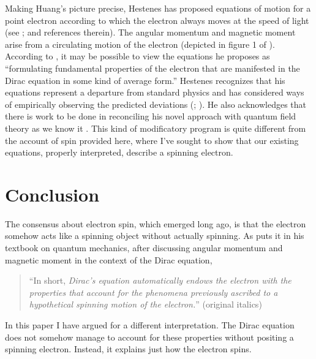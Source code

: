 \documentclass[12pt,secnumarabic,amsmath,amssymb,balancelastpage,nofootinbib]{article}
\begin{document}
Making Huang's picture precise, Hestenes has proposed equations of motion for a point electron according to which the electron always moves at the speed of light (see \citealp{gull1993}; \citealp{hestenes2008, hestenes2010} and references therein).  The angular momentum and magnetic moment arise from a circulating motion of the electron (depicted in figure 1 of \citealp{hestenes2008}).  According to \citet[pg.\ 2]{hestenes2010}, it may be possible to view the equations he proposes as ``formulating fundamental properties of the electron that are manifested in the Dirac equation in some kind of average form.''  Hestenes recognizes that his equations represent a departure from standard physics and has considered ways of empirically observing the predicted deviations (\citealp{hestenes2008}; \citealp[sections 9.1 and 11]{hestenes2010}).  He also acknowledges that there is work to be done in reconciling his novel approach with quantum field theory as we know it \citep[pg.\ 53]{hestenes2010}.  This kind of modificatory program is quite different from the account of spin provided here, where I've sought to show that our existing equations, properly interpreted, describe a spinning electron.






\section{Conclusion}

The consensus about electron spin, which emerged long ago, is that the electron somehow acts like a spinning object without actually spinning.  As \citet[pg.\ 514]{rojansky} puts it in his textbook on quantum mechanics, after discussing angular momentum and magnetic moment in the context of the Dirac equation,
\begin{quote}
``In short, \emph{Dirac's equation automatically endows the electron with the properties that account for the phenomena previously ascribed to a hypothetical spinning motion of the electron.}'' (original italics)
\end{quote}
In this paper I have argued for a different interpretation. The Dirac equation does not somehow manage to account for these properties without positing a spinning electron.  Instead, it explains just how the electron spins.
\end{document}
